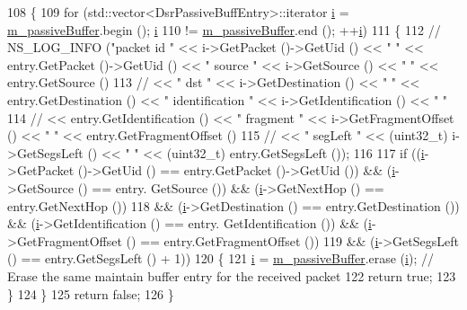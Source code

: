 \begin{DoxyCode}
108 \{
109   \textcolor{keywordflow}{for} (std::vector<DsrPassiveBuffEntry>::iterator \hyperlink{bernuolliDistribution_8m_a6f6ccfcf58b31cb6412107d9d5281426}{i} = \hyperlink{classns3_1_1dsr_1_1DsrPassiveBuffer_ab31ade1fb99b99f777a393ca21162535}{m\_passiveBuffer}.begin (); 
      \hyperlink{bernuolliDistribution_8m_a6f6ccfcf58b31cb6412107d9d5281426}{i}
110        != \hyperlink{classns3_1_1dsr_1_1DsrPassiveBuffer_ab31ade1fb99b99f777a393ca21162535}{m\_passiveBuffer}.end (); ++\hyperlink{bernuolliDistribution_8m_a6f6ccfcf58b31cb6412107d9d5281426}{i})
111     \{
112 \textcolor{comment}{//      NS\_LOG\_INFO ("packet id " << i->GetPacket ()->GetUid () << " " << entry.GetPacket ()->GetUid () <<
       " source " << i->GetSource () << " " << entry.GetSource ()}
113 \textcolor{comment}{//                                     << " dst " << i->GetDestination () << " " << entry.GetDestination ()
       << " identification " << i->GetIdentification () << " "}
114 \textcolor{comment}{//                                     << entry.GetIdentification () << " fragment " <<
       i->GetFragmentOffset () << " " << entry.GetFragmentOffset ()}
115 \textcolor{comment}{//                                     << " segLeft " << (uint32\_t) i->GetSegsLeft () << " " << (uint32\_t)
       entry.GetSegsLeft ());}
116 
117       \textcolor{keywordflow}{if} ((\hyperlink{bernuolliDistribution_8m_a6f6ccfcf58b31cb6412107d9d5281426}{i}->GetPacket ()->GetUid () == entry.GetPacket ()->GetUid ()) && (\hyperlink{bernuolliDistribution_8m_a6f6ccfcf58b31cb6412107d9d5281426}{i}->GetSource () == entry.
      GetSource ()) && (\hyperlink{bernuolliDistribution_8m_a6f6ccfcf58b31cb6412107d9d5281426}{i}->GetNextHop () == entry.GetNextHop ())
118           && (\hyperlink{bernuolliDistribution_8m_a6f6ccfcf58b31cb6412107d9d5281426}{i}->GetDestination () == entry.GetDestination ()) && (\hyperlink{bernuolliDistribution_8m_a6f6ccfcf58b31cb6412107d9d5281426}{i}->GetIdentification () == entry.
      GetIdentification ()) && (\hyperlink{bernuolliDistribution_8m_a6f6ccfcf58b31cb6412107d9d5281426}{i}->GetFragmentOffset () == entry.GetFragmentOffset ())
119           && (\hyperlink{bernuolliDistribution_8m_a6f6ccfcf58b31cb6412107d9d5281426}{i}->GetSegsLeft () == entry.GetSegsLeft () + 1))
120         \{
121           \hyperlink{bernuolliDistribution_8m_a6f6ccfcf58b31cb6412107d9d5281426}{i} = \hyperlink{classns3_1_1dsr_1_1DsrPassiveBuffer_ab31ade1fb99b99f777a393ca21162535}{m\_passiveBuffer}.erase (\hyperlink{bernuolliDistribution_8m_a6f6ccfcf58b31cb6412107d9d5281426}{i});   \textcolor{comment}{// Erase the same maintain buffer entry for the
       received packet}
122           \textcolor{keywordflow}{return} \textcolor{keyword}{true};
123         \}
124     \}
125   \textcolor{keywordflow}{return} \textcolor{keyword}{false};
126 \}
\end{DoxyCode}


